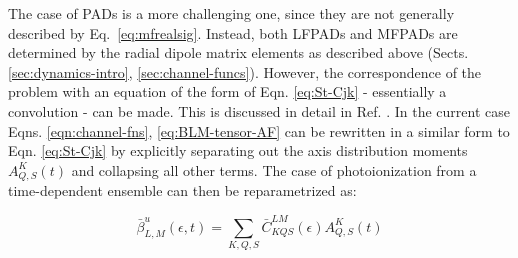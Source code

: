 \documentclass[10pt]{article}
\begin{document}

The case of PADs is a more challenging one, since they are not generally described by Eq.~\ref{eq:mfrealsig}. Instead, both LFPADs and MFPADs are determined by the radial dipole matrix elements as described above (Sects. \ref{sec:dynamics-intro}, \ref{sec:channel-funcs}). However, the correspondence of the problem with an equation of the form of Eqn. \ref{eq:St-Cjk} - essentially a convolution - can be made. This is discussed in detail in Ref. \cite{Underwood2000}. In the current case Eqns. \ref{eqn:channel-fns}, \ref{eq:BLM-tensor-AF} can be rewritten in a similar form to Eqn. \ref{eq:St-Cjk} by explicitly separating out the axis distribution moments $A_{Q,S}^{K}(t)$ and collapsing all other terms. The case of photoionization from a time-dependent ensemble can then be reparametrized as:




\begin{equation}
\bar{\beta}_{L,M}^{u}(\epsilon,t)=\sum_{K,Q,S}\bar{C}_{KQS}^{LM}(\epsilon)A_{Q,S}^{K}(t)
\label{eqn:beta-convolution-C}
\end{equation}
\end{document}
